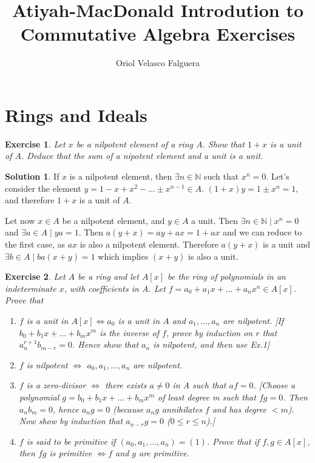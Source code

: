 \documentclass[12pt]{article}
\newcommand{\N}{\ensuremath{\mathbb{N}}}
\newtheorem{ex}{Exercise}[section]
\theoremstyle{definition}
\newtheorem*{sol}{Solution}
\begin{document}
\title{Atiyah-MacDonald Introdution to Commutative Algebra Exercises}
\author{Oriol Velasco Falguera}
\maketitle

\newpage 

\section{Rings and Ideals}

\begin{ex}
Let $x$ be a nilpotent element of a ring $A$. Show that $1+x$ is a unit of $A$. Deduce that the sum of a nipotent element and a unit is a unit.
\end{ex}

\begin{sol}
	If $x$ is a nilpotent element, then $\exists n \in \N$ such that $x^n = 0$. Let's consider the element $y = 1 - x + x^2 - \dots \pm x^{n-1} \in A$. $(1+x)y = 1 \pm x^n = 1$, and therefore $1+x$ is a unit of $A$.

	Let now $x \in A$ be a nilpotent element, and $y \in A$ a unit. Then $\exists n \in \N \mid x^n = 0$ and $\exists a \in A \mid ya = 1$. Then $a(y+x) = ay+ax = 1+ax$ and we can reduce to the first case, as $ax$ is also a nilpotent element. Therefore $a(y+x)$ is a unit and $\exists b \in A \mid ba(x+y) = 1$ which implies $(x+y)$ is also a unit. 
\end{sol}

\begin{ex}
Let $A$ be a ring and let $A[x]$ be the ring of polynomials in an indeterminate $x$, with coefficients in A. Let $f = a_0 + a_1 x + \dots + a_nx^n \in A[x]$. Prove that
\begin{enumerate}[label=(\roman*)]
		\item $f$ is a unit in $A[x] \iff a_0$ is a unit in $A$ and $a_1, \dots , a_n$ are nilpotent. [If $b_0 + b_1 x + \dots + b_mx^m$ is the inverse of $f$, prove by induction on $r$ that $a_n^{r+1}b_{m-r} = 0$. Hence show that $a_n$ is nilpotent, and then use Ex.1]
		\item $f$ is nilpotent $\iff$ $a_0 , a_1 , \dots , a_n$ are nilpotent.
		\item $f$ is a zero-divisor $\iff$ there exists $a \neq 0$ in A such that $af = 0$. [Choose a polynomial $g = b_0 + b_1 x + \dots + b_m x^m$ of least degree m such that $fg = 0$. Then $a_nb_m = 0$, hence $a_ng = 0$ (because $a_n g$ annihilates $f$ and has degree $< m$). Now show by induction that $a_{n-r} g = 0$ ($0 \leq r \leq n$).]
		\item $f$ is said to be primitive if $(a_0, a_1 , \dots , a_n) = (1)$. Prove that if $f,g \in A[x]$, then $fg$ is primitive $\iff f$ and $g$ are primitive.
\end{enumerate}
\end{ex}
\end{document}
